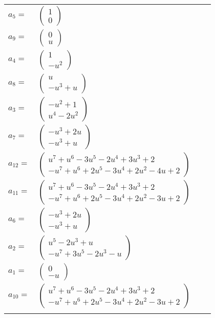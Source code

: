 \documentclass[1p]{elsarticle_modified}
\theoremstyle{definition}
\begin{document}
\begin{tabular}{m{7pt} m{180pt} m{7pt} m{180pt} }
\flushright $a_{5}=$&$\begin{pmatrix}1\\0\end{pmatrix}$ \\
\flushright $a_{9}=$&$\begin{pmatrix}0\\u\end{pmatrix}$ \\
\flushright $a_{4}=$&$\begin{pmatrix}1\\- u^2\end{pmatrix}$ \\
\flushright $a_{8}=$&$\begin{pmatrix}u\\- u^3+u\end{pmatrix}$ \\
\flushright $a_{3}=$&$\begin{pmatrix}- u^2+1\\u^4-2 u^2\end{pmatrix}$ \\
\flushright $a_{7}=$&$\begin{pmatrix}- u^3+2 u\\- u^3+u\end{pmatrix}$ \\
\flushright $a_{12}=$&$\begin{pmatrix}u^7+u^6-3 u^5-2 u^4+3 u^3+2\\- u^7+u^6+2 u^5-3 u^4+2 u^2-4 u+2\end{pmatrix}$ \\
\flushright $a_{11}=$&$\begin{pmatrix}u^7+u^6-3 u^5-2 u^4+3 u^3+2\\- u^7+u^6+2 u^5-3 u^4+2 u^2-3 u+2\end{pmatrix}$ \\
\flushright $a_{6}=$&$\begin{pmatrix}- u^3+2 u\\- u^3+u\end{pmatrix}$ \\
\flushright $a_{2}=$&$\begin{pmatrix}u^5-2 u^3+u\\- u^7+3 u^5-2 u^3- u\end{pmatrix}$ \\
\flushright $a_{1}=$&$\begin{pmatrix}0\\- u\end{pmatrix}$ \\
\flushright $a_{10}=$&$\begin{pmatrix}u^7+u^6-3 u^5-2 u^4+3 u^3+2\\- u^7+u^6+2 u^5-3 u^4+2 u^2-3 u+2\end{pmatrix}$\\&\end{tabular}
\end{document}
